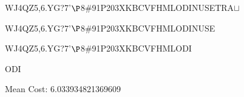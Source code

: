 \documentclass[12pt]{article}
\begin{document}
\begin{tt}
\begin{small}
\begin{bundle}{}
{\begin{bundle}{WJ4QZ5,6.YG?7'$\P$8\#91P203XKBCVFHMLODINUSETRA$\sqcup$}
{\begin{bundle}{WJ4QZ5,6.YG?7'$\P$8\#91P203XKBCVFHMLODINUSE}
{\begin{bundle}{WJ4QZ5,6.YG?7'$\P$8\#91P203XKBCVFHMLODI}
{\begin{bundle}{ODI}
\end{bundle}}
\end{bundle}}
\end{bundle}}
\end{bundle}}
\end{bundle}
\end{small}
\end{tt}
\newpage\newpage
\noindent
\noindent Mean Cost: 6.033934821369609\\
\end{document}
